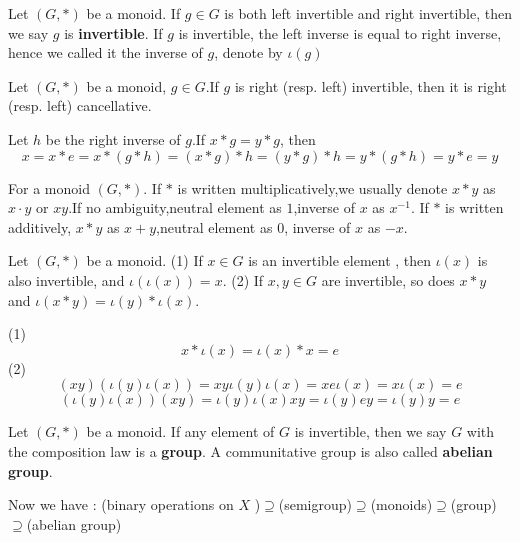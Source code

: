 \documentclass{book}
\numberwithin{equation}{section}
\begin{document}
\begin{definitionenv}
    Let $(G,*)$ be a monoid. If $g\in G$ is both left invertible and right invertible, then we say $g$ is \textbf{invertible}.
    If $g$ is invertible, the left inverse is equal to right inverse, hence we called it the inverse of $g$, denote by $\iota(g)$
\end{definitionenv}
\begin{propositionenv}
    Let $(G,*)$ be a monoid, $g\in G$.If $g$ is right (resp. left) invertible, then it is right (resp. left) cancellative.
\end{propositionenv}
\begin{proofenv}
    Let $h$ be the right inverse of $g$.If $x*g=y*g$, then 
    $$x=x*e=x*(g*h)=(x*g)*h=(y*g)*h=y*(g*h)=y*e=y$$
\end{proofenv}
\begin{notationenv}
    For a monoid $(G,*)$.
    \newline
    If $*$ is written multiplicatively,we usually denote $x*y$ as $x\cdot y$ or $xy$.If no ambiguity,neutral element as $1$,inverse of $x$ as $x^{-1}$.
    \newline
    If $*$ is written additively, $x*y$ as $x+y$,neutral element as $0$, inverse of $x$ as $-x$.
\end{notationenv}
\begin{propositionenv}\label{proposition5.2.4}
    Let $(G,*)$ be a monoid.
    \newline
    (1) If $x\in G$ is an invertible element , then $\iota (x)$ is also invertible, and $\iota(\iota(x))=x$.
    \newline
    (2) If $x,y\in G$ are invertible, so does $x*y$ and $\iota(x*y)=\iota(y)*\iota(x)$.
\end{propositionenv}
\begin{proofenv}
    \quad\newline
    (1) $$x*\iota(x)=\iota(x)*x=e$$
    (2) $$(xy)(\iota(y)\iota(x))=xy\iota(y)\iota(x)=xe\iota(x)=x\iota(x)=e$$
    $$(\iota(y)\iota(x))(xy)=\iota(y)\iota(x)xy=\iota(y)ey=\iota(y)y=e$$
\end{proofenv}
\begin{definitionenv}
    Let $(G,*)$ be a monoid. If any element of $G$ is invertible, then we say $G$ with the composition law is a \textbf{group}. A communitative group is also called \textbf{abelian group}.
\end{definitionenv}
\begin{box2}
   Now we have : 
   \newline
   {\color{mlv} (binary operations on $X$ )$\supseteq$(semigroup)$\supseteq$(monoids)$\supseteq$(group)$\supseteq$(abelian group)}

\end{box2}
\end{document}
